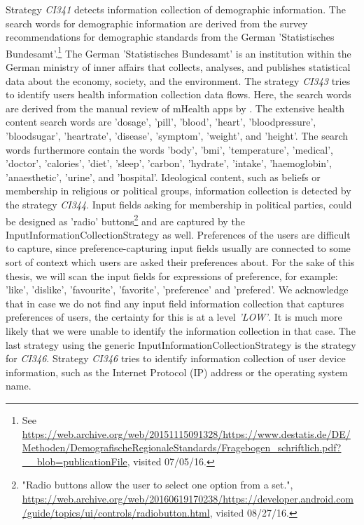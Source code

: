 Strategy \textit{CI341} detects information collection of demographic information.
The search words for demographic information are derived from the survey recommendations for demographic standards from the German 'Statistisches Bundesamt'.\footnote{\raggedright See \url{https://web.archive.org/web/20151115091328/https://www.destatis.de/DE/Methoden/DemografischeRegionaleStandards/Fragebogen_schriftlich.pdf?__blob=publicationFile}, visited 07/05/16.}
The German 'Statistisches Bundesamt' is an institution within the German ministry of inner affairs that collects, analyses, and publishes statistical data about the economy, society, and the environment.
The strategy \textit{CI343} tries to identify users health information collection data flows.
Here, the search words are derived from the manual review of mHealth apps by \textcite{Bruggemann2016}. 
The extensive health content search words are 'dosage', 'pill', 'blood', 'heart', 'bloodpressure', 'bloodsugar', 'heartrate', 'disease', 'symptom', 'weight', and 'height'.
The search words furthermore contain the words 'body', 'bmi', 'temperature', 'medical', 'doctor', 'calories', 'diet', 'sleep', 'carbon', 'hydrate', 'intake', 'haemoglobin', 'anaesthetic', 'urine', and 'hospital'.
Ideological content, such as beliefs or membership in religious or political groups, information collection is detected by the strategy \textit{CI344}.
Input fields asking for membership in political parties, could be designed as 'radio' buttons\footnote{\raggedright"Radio buttons allow the user to select one option from a set.", \url{https://web.archive.org/web/20160619170238/https://developer.android.com/guide/topics/ui/controls/radiobutton.html}, visited 08/27/16.} and are captured by the InputInformationCollectionStrategy as well.
Preferences of the users are difficult to capture, since preference-capturing input fields usually are connected to some sort of context which users are asked their preferences about.
For the sake of this thesis, we will scan the input fields for expressions of preference, for example: 'like', 'dislike', 'favourite', 'favorite', 'preference' and 'prefered'.
We acknowledge that in case we do not find any input field information collection that captures preferences of users, the certainty for this is at a level \textit{'LOW'}.
It is much more likely that we were unable to identify the information collection in that case.
The last strategy using the generic InputInformationCollectionStrategy is the strategy for \textit{CI346}. 
Strategy \textit{CI346} tries to identify information collection of user device information, such as the Internet Protocol (\acs{IP}) address or the operating system name.

